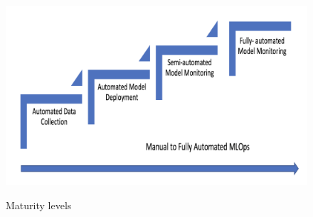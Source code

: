 \begin{figure}[!htbp]
    \caption{Maturity levels \cite{mlops-maturity-model}}
    \centering
    \includegraphics[scale=0.5]{images/maturity-levels}
    \label{fig:maturity}
\end{figure}


